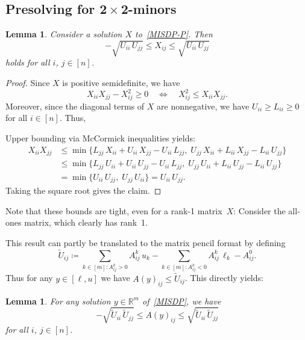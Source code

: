 \documentclass[10pt, a4paper]{article}
\newcommand{\define}{\coloneqq}
\newcommand{\R}{\mathds{R}}
\newtheorem{lemma}[theorem]{Lemma}
\begin{document}
\subsection{Presolving for $\boldsymbol{2 \times 2}$-minors}
\label{sec:2by2Minors}

\begin{lemma}
  Consider a solution $X$ to~\eqref{MISDP-P}. Then
  \[
    -\sqrt{U_{ii}\, U_{jj}} \leq X_{ij} \leq \sqrt{U_{ii}\, U_{jj}}
  \]
  holds for all $i$, $j \in [n]$.
\end{lemma}

\begin{proof}
  Since $X$ is positive semidefinite, we have
  \[
    X_{ii} X_{jj} - X_{ij}^2 \geq 0
    \quad\Leftrightarrow\quad
    X_{ij}^2 \leq X_{ii} X_{jj}.
  \]
  Moreover, since the diagonal terms of $X$ are nonnegative, we have
  $U_{ii} \geq L_{ii} \geq 0$ for all $i \in [n]$. Thus,

  Upper bounding via
  McCormick inequalities yields:
  \begin{align*}
    X_{ii} X_{jj} & \leq \min \{L_{jj}\, X_{ii} + U_{ii}\, X_{jj} - U_{ii}\, L_{jj},\;
                    U_{jj}\, X_{ii} + L_{ii}\, X_{jj} - L_{ii}\, U_{jj}\}  \\
    & \leq \min \{L_{jj}\, U_{ii} + U_{ii}\, U_{jj} - U_{ii}\, L_{jj},\;
                    U_{jj}\, U_{ii} + L_{ii}\, U_{jj} - L_{ii}\, U_{jj}\}  \\
    & = \min \{U_{ii}\, U_{jj},\;  U_{jj}\, U_{ii}\} = U_{ii}\, U_{jj}.
  \end{align*}
  Taking the square root gives the claim.
\end{proof}
Note that these bounds are tight, even for a rank-1 matrix~$X$: Consider
the all-ones matrix, which clearly has rank~1.

This result can partly be translated to the matrix pencil format by defining
\[
  \tilde{U}_{ij} \define \sum_{k \in [m]: A^k_{ij} > 0} A^k_{ij}\, u_k -
  \sum_{k \in [m]: A^k_{ij} < 0} A^k_{ij}\, \ell_k - A^0_{ij}.
\]
Thus for any $y \in [\ell,u]$ we have $A(y)_{ij} \leq \tilde{U}_{ij}$. This
directly yields:

\begin{lemma}\label{lem:Propagation}
  For any solution $y \in \R^m$ of~\eqref{MISDP}, we have
  \[
    -\sqrt{\tilde{U}_{ii}\,\tilde{U}_{jj}} \leq A(y)_{ij} \leq \sqrt{\tilde{U}_{ii}\,\tilde{U}_{jj}}
  \]
  for all $i$, $j \in [n]$.
\end{lemma}
\end{document}
